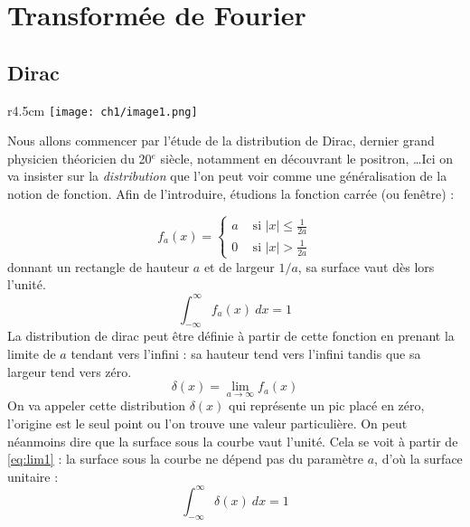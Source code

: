 \setcounter{chapter}{-1}
\chapter{Transformée de Fourier}
\section{Dirac}
\begin{wrapfigure}[15]{r}{4.5cm}
\vspace{-5mm}
\texttt{[image: ch1/image1.png]}
\end{wrapfigure}
Nous allons commencer par l'étude de la distribution de Dirac, dernier grand 
physicien théoricien du 20$^e$ siècle, notamment en découvrant le positron, 
\dots Ici on va insister sur la \textit{distribution} que l'on peut voir comme 
une généralisation de la notion de fonction. Afin de l'introduire, étudions la 
fonction carrée (ou fenêtre) :


\begin{equation}
f_a(x) =\left\{\begin{array}{ll}
a &\text{ si } |x| \leq \frac{1}{2a}\\
0 &\text{ si } |x| > \frac{1}{2a}
\end{array}\right.
\end{equation}
donnant un rectangle de hauteur $a$ et de largeur $1/a$, sa surface vaut dès lors 
l'unité. 
\begin{equation}
\int_{-\infty}^\infty f_a(x)\ dx = 1
\label{eq:lim1}
\end{equation}
La distribution de dirac peut être définie à partir de cette fonction 
en prenant la limite de $a$ tendant vers l'infini : sa hauteur tend vers 
l'infini tandis que sa largeur tend vers zéro.
\begin{equation}
\delta(x) = \lim\limits_{a\rightarrow\infty} f_a(x)
\end{equation}
On va appeler cette distribution $\delta(x)$ qui représente un pic placé en 
zéro, l'origine est le seul point ou l'on trouve une valeur particulière. On 
peut néanmoins dire que la surface sous la courbe vaut l'unité. Cela se 
voit à partir de \autoref{eq:lim1} : la surface sous la courbe ne dépend pas 
du paramètre $a$, d'où la surface unitaire :
\begin{equation}
\int_{-\infty}^\infty \delta(x)\ dx = 1
\end{equation}

